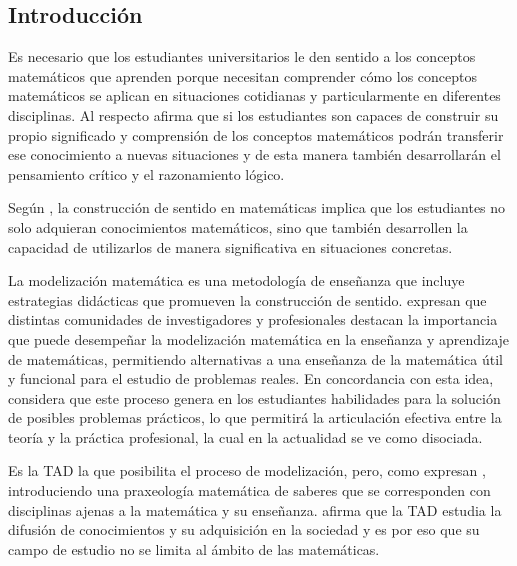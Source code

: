 \subsection{Introducción}

Es necesario que los estudiantes universitarios le den sentido a los conceptos matemáticos que aprenden porque necesitan comprender cómo los conceptos matemáticos se aplican en situaciones cotidianas y particularmente en diferentes disciplinas. Al respecto \textcite{brousseau2007} afirma que si los estudiantes son capaces de construir su propio significado y comprensión de los conceptos matemáticos podrán transferir ese conocimiento a nuevas situaciones y de esta manera también desarrollarán el pensamiento crítico y el razonamiento lógico.

Según \textcite{chevallard1999-11}, la construcción de sentido en matemáticas implica que los estudiantes no solo adquieran conocimientos matemáticos, sino que también desarrollen la capacidad de utilizarlos de manera significativa en situaciones concretas.

La modelización matemática es una metodología de enseñanza que incluye estrategias didácticas que promueven la construcción de sentido. \textcite{florensa2020} expresan que distintas comunidades de investigadores y profesionales destacan la importancia que puede desempeñar la modelización matemática en la enseñanza y aprendizaje de matemáticas, permitiendo alternativas a una enseñanza de la matemática útil y funcional para el estudio de problemas reales. En concordancia con esta idea, \textcite{brito2011} considera que este proceso genera en los estudiantes habilidades para la solución de posibles problemas prácticos, lo que permitirá la articulación efectiva entre la teoría y la práctica profesional, la cual en la actualidad se ve como disociada.

Es la TAD la que posibilita el proceso de modelización, pero, como expresan \textcite{sanchez2017}, introduciendo una praxeología matemática de saberes que se corresponden con disciplinas ajenas a la matemática y su enseñanza. \textcite{garcia2019} afirma que la TAD estudia la difusión de conocimientos y su adquisición en la sociedad y es por eso que su campo de estudio no se limita al ámbito de las matemáticas.

